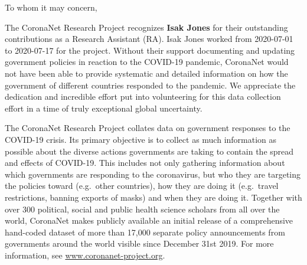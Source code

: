 \documentclass[
]{article}
\title{\vspace{-3cm}
\fontfamily{cmr}\fontsize{20}{100}\selectfont {\color{cngray} \textbf{Certificate of Appreciation}}}
\author{}
\date{\vspace{-2.5em}}
\begin{document}
\maketitle

\addtolength{\headheight}{2.0cm}
\pagestyle{fancyplain}
\fancyhf{}
\renewcommand{\headrulewidth}{0pt}

\fontsize{12}{4}\selectfont
\setlength{\baselineskip}{0.5cm}

\color{cntext}

To whom it may concern,

The CoronaNet Research Project recognizes \textbf{Isak Jones} for their
outstanding contributions as a Research Assistant (RA). Isak Jones
worked from 2020-07-01 to 2020-07-17 for the project. Without their
support documenting and updating government policies in reaction to the
COVID-19 pandemic, CoronaNet would not have been able to provide
systematic and detailed information on how the government of different
countries responded to the pandemic. We appreciate the dedication and
incredible effort put into volunteering for this data collection effort
in a time of truly exceptional global uncertainty.

The CoronaNet Research Project collates data on government responses to
the COVID-19 crisis. Its primary objective is to collect as much
information as possible about the diverse actions governments are taking
to contain the spread and effects of COVID-19. This includes not only
gathering information about which governments are responding to the
coronavirus, but who they are targeting the policies toward (e.g.~other
countries), how they are doing it (e.g.~travel restrictions, banning
exports of masks) and when they are doing it. Together with over 300
political, social and public health science scholars from all over the
world, CoronaNet makes publicly available an initial release of a
comprehensive hand-coded dataset of more than 17,000 separate policy
announcements from governments around the world visible since December
31st 2019. For more information, see \url{www.coronanet-project.org}.
\end{document}
